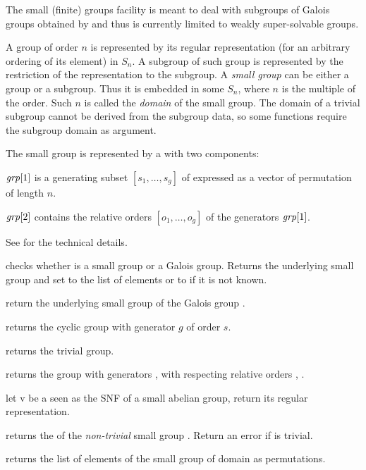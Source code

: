 The small (finite) groups facility is meant to deal with subgroups of Galois
groups obtained by  and thus is currently limited to weakly
super-solvable groups.

A group  of order $n$ is represented by its regular representation
(for an arbitrary ordering of its element) in $S_n$.  A subgroup of such group
is represented by the restriction of the representation to the subgroup.
A \emph{small group} can be either a group or a subgroup. Thus it is embedded
in some $S_n$, where $n$ is the multiple of the order. Such $n$ is called the
\emph{domain} of the small group. The domain of a trivial subgroup cannot be
derived from the subgroup data, so some functions require the subgroup domain
as argument.

The small group  is represented by a  with two
components:

$\hbox{\it grp\/}[1]$ is a generating subset $[s_1,\ldots,s_g]$ of 
expressed as a vector of permutation of length $n$.

$\hbox{\it grp\/}[2]$ contains the relative orders $[o_1,\ldots,o_g]$ of
the generators $\hbox{\it grp\/}[1]$.

See  for the technical details.

 checks whether  is a
small group or a Galois group. Returns the underlying small
group and set  to the list of elements or to  if it is not
known.

 return the underlying small group of the
Galois group .

 returns the cyclic group with generator
$g$ of order $s$.

 returns the trivial group.

 returns the group
with generators ,  with respecting relative orders ,
.

 let v be a  seen as the SNF of
a small abelian group, return its regular representation.

 returns the  of the
\emph{non-trivial} small group . Return an error if  is
trivial.

 returns the list of elements of the
small group  of domain  as permutations.

